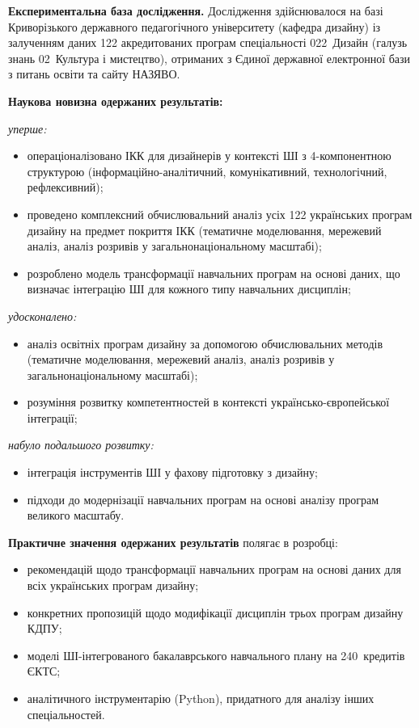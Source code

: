 \textbf{Експериментальна база дослідження.} Дослідження здійснювалося на базі Криворізького державного педагогічного університету (кафедра дизайну) із залученням даних 122 акредитованих програм спеціальності 022~Дизайн (галузь знань 02~Культура і мистецтво), отриманих з Єдиної державної електронної бази з питань освіти та сайту НАЗЯВО.

\textbf{Наукова новизна одержаних результатів:}

\textit{уперше:}
\begin{itemize}
    \item операціоналізовано ІКК для дизайнерів у контексті ШІ з 4-компонентною структурою (інформаційно-аналітичний, комунікативний, технологічний, рефлексивний);
    \item проведено комплексний обчислювальний аналіз усіх 122 українських програм дизайну на предмет покриття ІКК (тематичне моделювання, мережевий аналіз, аналіз розривів у загальнонаціональному масштабі);
    \item розроблено модель трансформації навчальних програм на основі даних, що визначає інтеграцію ШІ для кожного типу навчальних дисциплін;
\end{itemize}

\textit{удосконалено:}
\begin{itemize}
    \item аналіз освітніх програм дизайну за допомогою обчислювальних методів (тематичне моделювання, мережевий аналіз, аналіз розривів у загальнонаціональному масштабі);
    \item розуміння розвитку компетентностей в контексті українсько-європейської інтеграції;
\end{itemize}

\textit{набуло подальшого розвитку:}
\begin{itemize}
    \item інтеграція інструментів ШІ у фахову підготовку з дизайну;
    \item підходи до модернізації навчальних програм на основі аналізу програм великого масштабу.
\end{itemize}

\textbf{Практичне значення одержаних результатів} полягає в розробці:
\begin{itemize}
    \item рекомендацій щодо трансформації навчальних програм на основі даних для всіх українських програм дизайну;
    \item конкретних пропозицій щодо модифікації дисциплін трьох програм дизайну КДПУ;
    \item моделі ШІ-інтегрованого бакалаврського навчального плану на 240~кредитів ЄКТС;
    \item аналітичного інструментарію (Python), придатного для аналізу інших спеціальностей.
\end{itemize}

